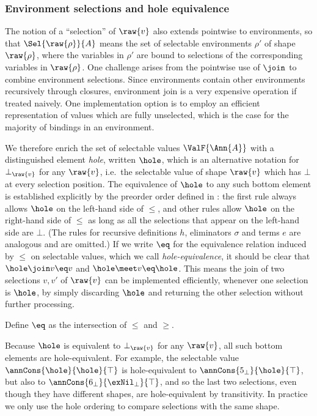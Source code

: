 \subsubsection{Environment selections and hole equivalence}

The notion of a ``selection'' of $\raw{v}$ also extends pointwise to environments, so that $\Sel{\raw{\rho}}{A}$ means the set of selectable environments $\rho'$ of shape $\raw{\rho}$, where the variables in $\rho'$ are bound to selections of the corresponding variables in $\raw{\rho}$. One challenge arises from the pointwise use of $\join$ to combine environment selections. Since environments contain other environments recursively through closures, environment join is a very expensive operation if treated naively. One implementation option is to employ an efficient representation of values which are fully unselected, which is the case for the majority of bindings in an environment.

We therefore enrich the set of selectable values $\ValF{\Ann{A}}$ with a distinguished element \emph{hole}, written $\hole$, which is an alternative notation for $\bot_{\raw{v}}$ for any $\raw{v}$, i.e.~the selectable value of shape $\raw{v}$ which has $\bot$ at every selection position. The equivalence of $\hole$ to any such bottom element is established explicitly by the preorder order defined in : the first rule always allows $\hole$ on the left-hand side of $\leq$, and other rules allow $\hole$ on the right-hand side of $\leq$ as long as all the selections that appear on the left-hand side are $\bot$. (The rules for recursive definitions $h$, eliminators $\sigma$ and terms $e$ are analogous and are omitted.) If we write $\eq$ for the equivalence relation induced by $\leq$ on selectable values, which we call \emph{hole-equivalence}, it should be clear that $\hole \join v \eq v$ and $\hole \meet v \eq \hole$. This means the join of two selections $v, v'$ of $\raw{v}$ can be implemented efficiently, whenever one selection is $\hole$, by simply discarding $\hole$ and returning the other selection without further processing.

\begin{definition}
   Define $\eq$ as the intersection of $\leq$ and $\geq$.
\end{definition}

Because $\hole$ is equivalent to $\bot_{\raw{v}}$ for any $\raw{v}$, all such bottom elements are hole-equivalent. For example, the selectable value $\annCons{\hole}{\hole}{\top}$ is hole-equivalent to $\annCons{5_{\bot}}{\hole}{\top}$, but also to $\annCons{6_{\bot}}{{\exNil_{\bot}}}{\top}$, and so the last two selections, even though they have different shapes, are hole-equivalent by transitivity. In practice we only use the hole ordering to compare selections with the same shape.
